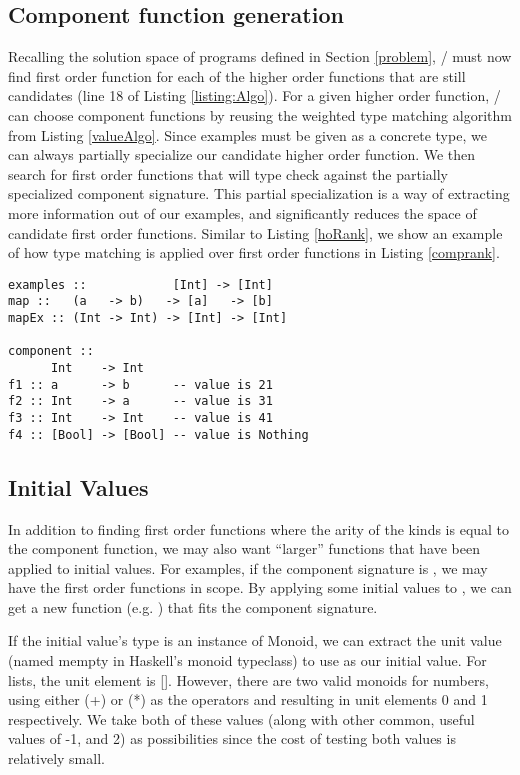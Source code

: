 \subsection{Component function generation}\label{makeFxns}

Recalling the solution space of programs defined in Section \ref{problem}, \ourTool/ must now find first order function for each of the higher order functions that are still candidates (line 18 of Listing \ref{listing:Algo}).
For a given higher order function, \ourTool/ can choose component functions by reusing the weighted type matching algorithm from Listing \ref{valueAlgo}.
Since examples must be given as a concrete type, we can always partially specialize our candidate higher order function. 
We then search for first order functions that will type check against the partially specialized component signature.
This partial specialization is a way of extracting more information out of our examples, and significantly reduces the space of candidate first order functions.
Similar to Listing \ref{hoRank}, we show an example of how type matching is applied over first order functions in Listing \ref{comprank}.

\begin{lstlisting}[caption=Ranking component function,label=comprank]
examples ::            [Int] -> [Int]
map ::   (a   -> b)   -> [a]   -> [b]
mapEx :: (Int -> Int) -> [Int] -> [Int]

component ::
      Int    -> Int
f1 :: a      -> b      -- value is 21
f2 :: Int    -> a      -- value is 31
f3 :: Int    -> Int    -- value is 41
f4 :: [Bool] -> [Bool] -- value is Nothing
\end{lstlisting}

\subsection{Initial Values}\label{initVals}

In addition to finding first order functions where the arity of the kinds is equal to the component function, we may also want ``larger'' functions that have been applied to initial values.
For examples, if the component signature is , we may have the first order functions  in scope.
By applying some initial values to \codeinline{(+)}, we can get a new function (e.g. ) that fits the component signature.

If the initial value's type is an instance of Monoid, we can extract the unit value (named mempty in Haskell's monoid typeclass\cite{monoid}) to use as our initial value. For lists, the unit element is []. However, there are two valid monoids for numbers, using either (+) or (*) as the operators and resulting in unit elements 0 and 1 respectively. We take both of these values (along with other common, useful values of -1, and 2) as possibilities since the cost of testing both values is relatively small.

